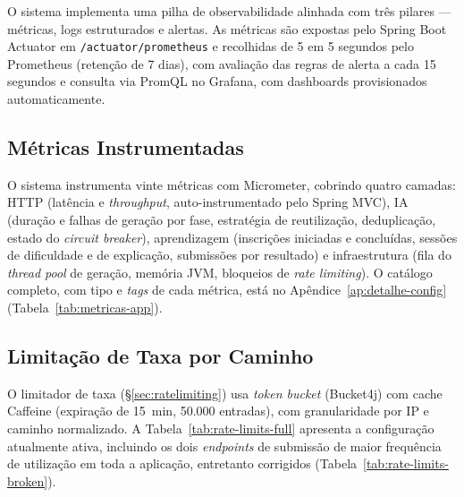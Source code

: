 O sistema implementa uma pilha de observabilidade alinhada com três pilares --- métricas, logs estruturados e alertas. As métricas são expostas pelo Spring Boot Actuator em \texttt{/actuator/prometheus} e recolhidas de 5 em 5 segundos pelo Prometheus (retenção de 7 dias), com avaliação das regras de alerta a cada 15 segundos e consulta via PromQL no Grafana, com dashboards provisionados automaticamente.

\subsection{Métricas Instrumentadas} \label{sec:metricas-app}

O sistema instrumenta vinte métricas com Micrometer, cobrindo quatro camadas: HTTP (latência e \textit{throughput}, auto-instrumentado pelo Spring MVC), IA (duração e falhas de geração por fase, estratégia de reutilização, deduplicação, estado do \textit{circuit breaker}), aprendizagem (inscrições iniciadas e concluídas, sessões de dificuldade e de explicação, submissões por resultado) e infraestrutura (fila do \textit{thread pool} de geração, memória JVM, bloqueios de \textit{rate limiting}). O catálogo completo, com tipo e \textit{tags} de cada métrica, está no Apêndice~\ref{ap:detalhe-config} (Tabela~\ref{tab:metricas-app}).

\subsection{Limitação de Taxa por Caminho} \label{sec:rate-limit-metrics}

O limitador de taxa (§\ref{sec:ratelimiting}) usa \textit{token bucket} (Bucket4j) com cache Caffeine (expiração de 15~min, 50.000 entradas), com granularidade por IP e caminho normalizado. A Tabela~\ref{tab:rate-limits-full} apresenta a configuração atualmente ativa, incluindo os dois \textit{endpoints} de submissão de maior frequência de utilização em toda a aplicação, entretanto corrigidos (Tabela~\ref{tab:rate-limits-broken}).

